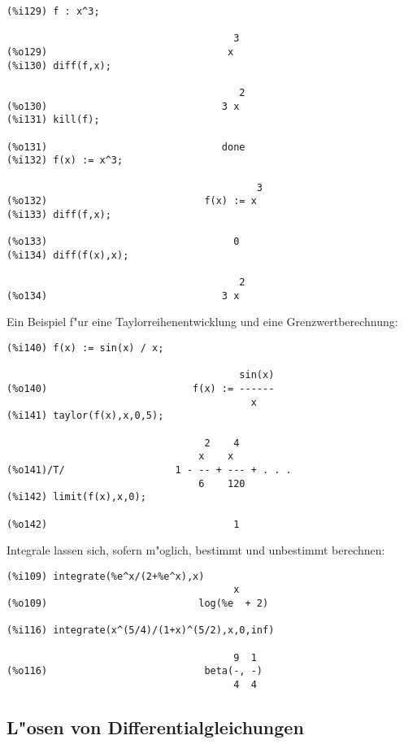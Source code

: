 \documentclass[ngerman,12pt,a4paper]{article}
\begin{document}
\scriptsize
\begin{verbatim}
(%i129) f : x^3;

                                       3
(%o129)                               x
(%i130) diff(f,x);

                                        2
(%o130)                              3 x
(%i131) kill(f);

(%o131)                              done
(%i132) f(x) := x^3;

                                           3
(%o132)                           f(x) := x
(%i133) diff(f,x);

(%o133)                                0
(%i134) diff(f(x),x);

                                        2
(%o134)                              3 x
\end{verbatim}
\normalsize

Ein Beispiel f"ur eine Taylorreihenentwicklung und eine Grenzwertberechnung:

\scriptsize
\begin{verbatim}
(%i140) f(x) := sin(x) / x;

                                        sin(x)
(%o140)                         f(x) := ------
                                          x
(%i141) taylor(f(x),x,0,5);

                                  2    4
                                 x    x
(%o141)/T/                   1 - -- + --- + . . .
                                 6    120
(%i142) limit(f(x),x,0);

(%o142)                                1
\end{verbatim}
\normalsize

Integrale lassen sich, sofern m"oglich, bestimmt und unbestimmt berechnen:

\scriptsize
\begin{verbatim}
(%i109) integrate(%e^x/(2+%e^x),x)
                                       x
(%o109)                          log(%e  + 2)

(%i116) integrate(x^(5/4)/(1+x)^(5/2),x,0,inf)

                                       9  1
(%o116)                           beta(-, -)
                                       4  4
\end{verbatim}
\normalsize



\subsection{L"osen von Differentialgleichungen}
\end{document}

